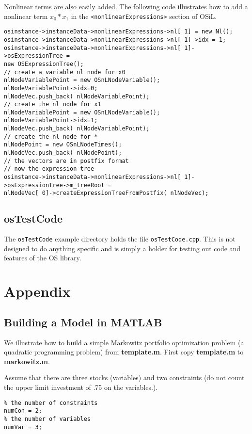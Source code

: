 \documentclass[11pt]{article}
\renewcommand{\_}{{\char"5F}}
\renewcommand{\{}{{\char"7B}}
\renewcommand{\}}{{\char"7D}}
\renewcommand{\^}{{\char"0D}}
\renewcommand{\'}{{\char"0D}}
\begin{document}
Nonlinear terms are also easily added.  The following code illustrates how to add a nonlinear term $x_{0}*x_{1}$ in the {\tt <nonlinearExpressions>} section of  OSiL.
\begin{verbatim}
osinstance->instanceData->nonlinearExpressions->nl[ 1] = new Nl();
osinstance->instanceData->nonlinearExpressions->nl[ 1]->idx = 1;
osinstance->instanceData->nonlinearExpressions->nl[ 1]->osExpressionTree =
new OSExpressionTree();
// create a variable nl node for x0
nlNodeVariablePoint = new OSnLNodeVariable();
nlNodeVariablePoint->idx=0;
nlNodeVec.push_back( nlNodeVariablePoint);
// create the nl node for x1
nlNodeVariablePoint = new OSnLNodeVariable();
nlNodeVariablePoint->idx=1;
nlNodeVec.push_back( nlNodeVariablePoint);
// create the nl node for *
nlNodePoint = new OSnLNodeTimes();
nlNodeVec.push_back( nlNodePoint);
// the vectors are in postfix format
// now the expression tree
osinstance->instanceData->nonlinearExpressions->nl[ 1]->osExpressionTree->m_treeRoot =
nlNodeVec[ 0]->createExpressionTreeFromPostfix( nlNodeVec);
\end{verbatim}

\subsection{osTestCode}\label{subsection:exampleOSInstanceGeneration}

The {\tt osTestCode} example directory holds the file {\tt osTestCode.cpp}. This is not designed to do anything specific and is simply a holder for testing out code and features of the OS library.

\section{Appendix}\label{section:appendix}


\subsection{Building a Model in MATLAB}

We illustrate how to build a simple Markowitz portfolio optimization problem (a quadratic programming problem) from {\bf template.m}. First copy {\bf template.m} to {\bf markowitz.m}.

Assume that there are three stocks (variables) and two constraints (do not count the upper limit investment of .75 on the variables.).


\begin{verbatim}
% the number of constraints
numCon = 2;
% the number of variables
numVar = 3;
\end{verbatim}
\end{document}
